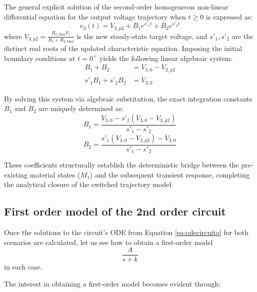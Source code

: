 \documentclass[energies,accept,oneauthor,pdftex]{Definitions/mdpi}
\begin{document}
The general explicit solution of the second-order homogeneous non-linear differential equation for the output voltage trajectory when $t \ge 0$ is expressed as:
\begin{equation}
    v_3(t) = V_{3,p2} + B_1 e^{s'_1 t} + B_2 e^{s'_2 t}
\end{equation}
where $V_{3,p2} = \frac{R_{2,\text{final}}V_1}{R_1 + R_{2,\text{final}}}$ is the new steady-state target voltage, and $s'_1, s'_2$ are the distinct real roots of the updated characteristic equation. Imposing the initial boundary conditions at $t=0^+$ yields the following linear algebraic system:
\begin{align}
    B_1 + B_2 &= V_{3,0} - V_{3,p2} \\
    s'_1 B_1 + s'_2 B_2 &= \dot{V}_{3,0}
\end{align}

By solving this system via algebraic substitution, the exact integration constants $B_1$ and $B_2$ are uniquely determined as:
\begin{equation}
    B_1 = \frac{\dot{V}_{3,0} - s'_2(V_{3,0} - V_{3,p2})}{s'_1 - s'_2}
\end{equation}
\begin{equation}
    B_2 = \frac{s'_1(V_{3,0} - V_{3,p2}) - \dot{V}_{3,0}}{s'_1 - s'_2}
\end{equation}

These coefficients structurally establish the deterministic bridge between the pre-existing material states ($M_1$) and the subsequent transient response, completing the analytical closure of the switched trajectory model.



\subsection{First order model of the 2nd order circuit}

Once the solutions to the circuit's ODE from Equation \ref{eq:odecircuito} for both scenarios are calculated, let us see how to obtain a first-order model
\[ \frac{A}{s + k} \]
in each case.

The interest in obtaining a first-order model becomes evident through:
\end{document}
